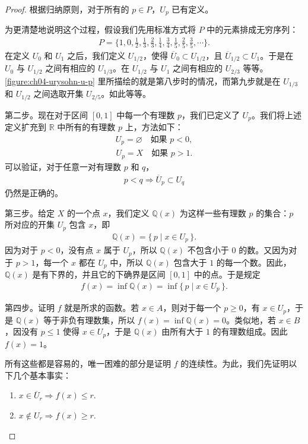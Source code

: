 \begin{proof}
根据归纳原则，对于所有的 $p\in P$，$U_{p}$ 已有定义。

为更清楚地说明这个过程，假设我们先用标准方式将 $P$ 中的元素排成无穷序列：
\begin{align*}
P=\Big\{1,0,\frac{1}{2},\frac{1}{3},\frac{2}{3},\frac{1}{4},\frac{3}{4},\frac{1}{5},\frac{2}{5},\frac{3}{5},\cdots\Big\}.
\end{align*}
在定义 $U_{0}$ 和 $U_{1}$ 之后，我们定义 $U_{1/2}$，使得 $\overline{U}_{0}\subset U_{1/2}$，且 $\overline{U}_{1/2}\subset U_{1}$。于是在 $U_{0}$ 与 $U_{1/2}$ 之间有相应的 $U_{1/3}$。在 $U_{1/2}$ 与 $U_{1}$ 之间有相应的 $U_{2/3}$ 等等。\cref{figure:ch04-urysohn-u-p} 里所描绘的就是第八步时的情况，而第九步就是在 $U_{1/3}$ 和 $U_{1/2}$ 之间选取开集 $U_{2/5}$。如此等等。

第二步。现在对于区间 $[0,1]$ 中每一个有理数 $p$，我们已定义了 $U_{p}$。我们将上述定义扩充到 $\mathbb{R}$ 中所有的有理数 $p$ 上，方法如下：
\begin{align*}
U_{p}=\varnothing\quad\text{如果 }p<0,
\end{align*}
\begin{align*}
U_{p}=X\quad\text{如果 }p>1.
\end{align*}
可以验证，对于任意一对有理数 $p$ 和 $q$，
\begin{align*}
p<q\Longrightarrow\overline{U}_{p}\subset U_{q}
\end{align*}
仍然是正确的。

第三步。给定 $X$ 的一个点 $x$，我们定义 $\mathbb{Q}(x)$ 为这样一些有理数 $p$ 的集合：$p$ 所对应的开集 $U_{p}$ 包含 $x$，即
\begin{align*}
\mathbb{Q}(x)=\{\,p\mid x\in U_{p}\,\}.
\end{align*}
因为对于 $p<0$，没有点 $x$ 属于 $U_{p}$，所以 $\mathbb{Q}(x)$ 不包含小于 $0$ 的数。又因为对于 $p>1$，每一个 $x$ 都在 $U_{p}$ 中，所以 $\mathbb{Q}(x)$ 包含大于 $1$ 的每一个数。因此，$\mathbb{Q}(x)$ 是有下界的，并且它的下确界是区间 $[0,1]$ 中的点。于是规定
\begin{align*}
f(x)=\inf\mathbb{Q}(x)=\inf\{\,p\mid x\in U_{p}\,\}.
\end{align*}

第四步。证明 $f$ 就是所求的函数。若 $x\in A$，则对于每一个 $p\geqslant 0$，有 $x\in U_{p}$，于是 $\mathbb{Q}(x)$ 等于非负有理数集，所以 $f(x)=\inf\mathbb{Q}(x)=0$。类似地，若 $x\in B$，因没有 $p\leqslant 1$ 使得 $x\in U_{p}$，于是 $\mathbb{Q}(x)$ 由所有大于 $1$ 的有理数组成。因此 $f(x)=1$。

所有这些都是容易的，唯一困难的部分是证明 $f$ 的连续性。为此，我们先证明以下几个基本事实：
\begin{enumerate}
\item $x\in\overline{U}_{r}\Longrightarrow f(x)\leqslant r$.
\item $x\notin U_{r}\Longrightarrow f(x)\geqslant r$.
\end{enumerate}


\end{proof}
